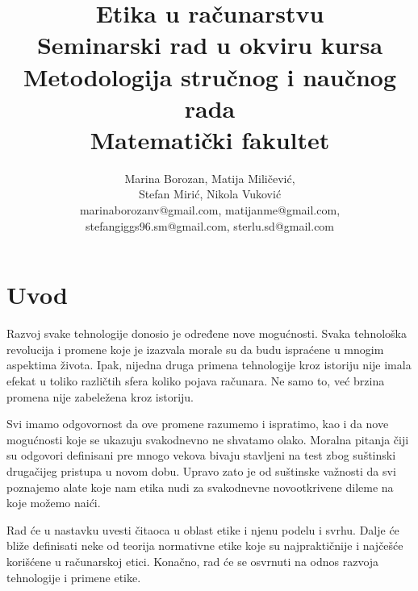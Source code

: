 \documentclass[a4paper]{article}
\begin{document}
\title{Etika u računarstvu\\ \small{Seminarski rad u okviru kursa\\Metodologija stručnog i naučnog rada\\ Matematički fakultet}}

\author{
	Marina Borozan, Matija Miličević,\\
	Stefan Mirić, Nikola Vuković\\
	marinaborozanv@gmail.com, matijanme@gmail.com,\\
	stefangiggs96.sm@gmail.com, sterlu.sd@gmail.com
}


\maketitle


\tableofcontents

\newpage

\section{Uvod}

Razvoj svake tehnologije donosio je određene nove mogućnosti. Svaka tehnološka revolucija i promene koje je izazvala morale su da budu ispraćene u mnogim aspektima života. Ipak, nijedna druga primena tehnologije kroz istoriju nije imala efekat u toliko različtih sfera koliko pojava računara. Ne samo to, već brzina promena nije zabeležena kroz istoriju. 

Svi imamo odgovornost da ove promene razumemo i ispratimo, kao i da nove mogućnosti koje se ukazuju svakodnevno ne shvatamo olako. Moralna pitanja čiji su odgovori definisani pre mnogo vekova bivaju stavljeni na test zbog suštinski drugačijeg pristupa u novom dobu. Upravo zato je od suštinske važnosti da svi poznajemo alate koje nam etika nudi za svakodnevne novootkrivene dileme na koje možemo naići. 

Rad će u nastavku uvesti čitaoca u oblast etike i njenu podelu i svrhu. Dalje će bliže definisati neke od teorija normativne etike koje su najpraktičnije i najčešće korišćene u računarskoj etici. Konačno, rad će se osvrnuti na odnos razvoja tehnologije i primene etike. 
\end{document}
